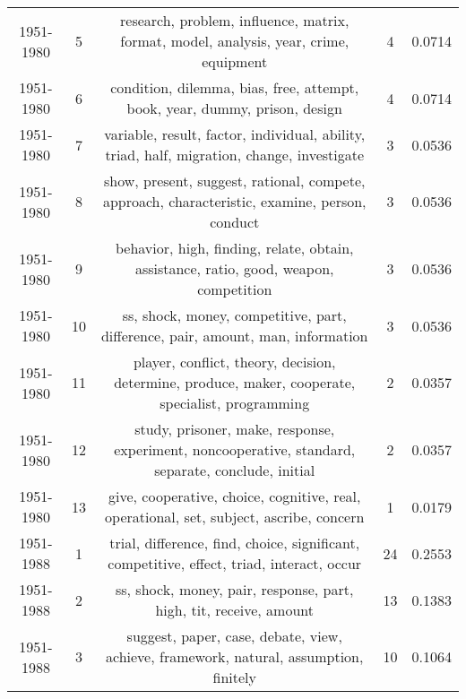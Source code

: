 \begin{tabular}{ccccc}
 1951-1980 &               5 &                         research, problem, influence, matrix, format, model, analysis, year, crime, equipment &                4 &                  0.0714 \\
 1951-1980 &               6 &                                    condition, dilemma, bias, free, attempt, book, year, dummy, prison, design &                4 &                  0.0714 \\
 1951-1980 &               7 &                    variable, result, factor, individual, ability, triad, half, migration, change, investigate &                3 &                  0.0536 \\
 1951-1980 &               8 &                 show, present, suggest, rational, compete, approach, characteristic, examine, person, conduct &                3 &                  0.0536 \\
 1951-1980 &               9 &                         behavior, high, finding, relate, obtain, assistance, ratio, good, weapon, competition &                3 &                  0.0536 \\
 1951-1980 &              10 &                               ss, shock, money, competitive, part, difference, pair, amount, man, information &                3 &                  0.0536 \\
 1951-1980 &              11 &             player, conflict, theory, decision, determine, produce, maker, cooperate, specialist, programming &                2 &                  0.0357 \\
 1951-1980 &              12 &            study, prisoner, make, response, experiment, noncooperative, standard, separate, conclude, initial &                2 &                  0.0357 \\
 1951-1980 &              13 &                       give, cooperative, choice, cognitive, real, operational, set, subject, ascribe, concern &                1 &                  0.0179 \\
 \midrule
 1951-1988 &               1 &                     trial, difference, find, choice, significant, competitive, effect, triad, interact, occur &               24 &                  0.2553 \\
 1951-1988 &               2 &                                            ss, shock, money, pair, response, part, high, tit, receive, amount &               13 &                  0.1383 \\
 1951-1988 &               3 &                         suggest, paper, case, debate, view, achieve, framework, natural, assumption, finitely &               10 &                  0.1064 \\

\end{tabular}
